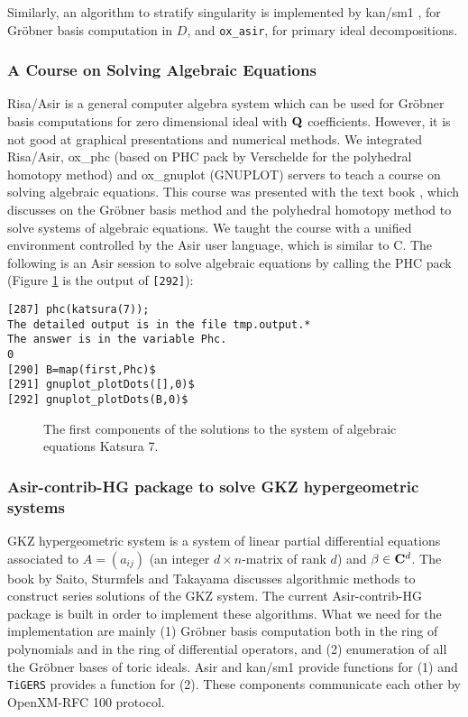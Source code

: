 Similarly, 
an algorithm to stratify singularity 
\cite{oaku-advance}
is implemented by
kan/sm1 \cite{kan}, for Gr\"obner basis computation in $D$, and
{\tt ox\_asir}, for primary ideal decompositions.

\subsubsection{A Course on Solving Algebraic Equations}

Risa/Asir \cite{asir} is a general computer algebra system
which can be used for Gr\"obner basis computations for zero dimensional ideal
with ${\bf Q}$ coefficients.
However, it is not good at graphical presentations and
numerical methods.
We integrated Risa/Asir, ox\_phc (based on PHC pack by Verschelde \cite{phc}
for the polyhedral homotopy method) and
ox\_gnuplot (GNUPLOT) servers
to teach a course on solving algebraic equations.
This course was presented with the text book \cite{CLO},
which discusses 
on the Gr\"obner basis method and the polyhedral homotopy method
to solve systems of algebraic equations.
We taught the course
with a unified environment
controlled by the Asir user language, which is similar to C.
The following is an Asir session to solve algebraic equations by calling
the PHC pack (Figure \ref{katsura} is the output of {\tt [292]}):
\begin{verbatim}
[287] phc(katsura(7));
The detailed output is in the file tmp.output.*
The answer is in the variable Phc.
0
[290] B=map(first,Phc)$
[291] gnuplot_plotDots([],0)$
[292] gnuplot_plotDots(B,0)$
\end{verbatim}

\begin{figure}[htbp]
\epsfxsize=8.5cm
\caption{The first components of the solutions to the system of algebraic equations Katsura 7.}
\label{katsura}
\end{figure}

\subsubsection{Asir-contrib-HG package to solve GKZ hypergeometric systems}

GKZ hypergeometric system is a system of linear partial differential
equations associated to $A=(a_{ij})$  
(an integer $d\times n$-matrix of rank $d$)
and $\beta \in {\bf C}^d$.
The book by Saito, Sturmfels and Takayama \cite{sst-book}
discusses algorithmic methods to construct series solutions of the GKZ
system.
The current Asir-contrib-HG package is built in order to implement
these algorithms.
What we need for the implementation are mainly
(1) Gr\"obner basis computation both in the ring of polynomials
and in the ring of differential operators,
and
(2) enumeration of all the Gr\"obner bases of toric ideals.
Asir and kan/sm1 provide functions for (1) and
{\tt TiGERS} provides a function for (2).
These components communicate each other by OpenXM-RFC 100 protocol.

